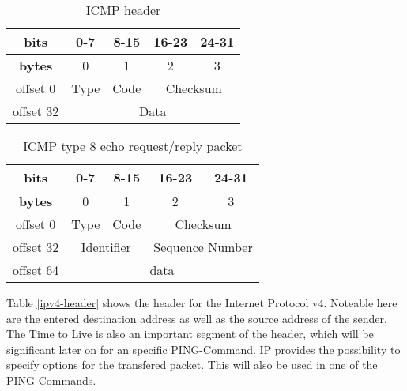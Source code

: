 \begin{table}[H]
	\centering
	\label{abstract-icmp-header}
	\begin{tabular}{|c|c|c|c|c|}
		\hline
		\textbf{bits}  & 0-7  & 8-15 & 16-23         & 24-31         \\ \hline
		\textbf{bytes} & 0    & 1    & 2             & 3             \\ \hline
		offset 0       & Type & Code & \multicolumn{2}{c|}{Checksum} \\ \hline
		offset 32      & \multicolumn{4}{c|}{Data}                   \\ \hline
	\end{tabular}
	\caption{ICMP header}
\end{table}

\begin{table}[H]
	\centering
	\label{icmp-echo-request-header}
	\begin{tabular}{|c|c|c|c|c|}
		\hline
		\textbf{bits}                   & 0-7            & 8-15           & 16-23             & 24-31            \\ \hline
		\textbf{bytes}                  & 0              & 1              & 2                 & 3                \\ \hline
		offset 0                        & Type           & Code           & \multicolumn{2}{c|}{Checksum}        \\ \hline
		\multicolumn{1}{|l|}{offset 32} & \multicolumn{2}{c|}{Identifier} & \multicolumn{2}{c|}{Sequence Number} \\ \hline
		offset 64                       & \multicolumn{4}{c|}{data}                                              \\ \hline
	\end{tabular}
	\caption{ICMP type 8 echo request/reply packet }
	
\end{table}

Table \ref{ipv4-header} shows the header for the Internet Protocol v4. Noteable here are the entered destination address as well as the source address of the sender. The Time to Live is also an important segment of the header, which will be significant later on for an specific PING-Command. IP provides the possibility to specify options for the transfered packet. This will also be used in one of the PING-Commands.

